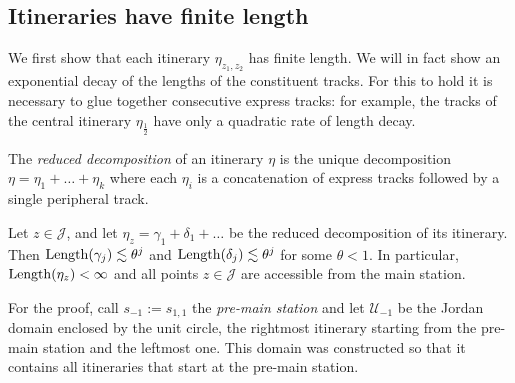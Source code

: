 \subsection{Itineraries have finite length}
We first show that each itinerary $\eta_{z_1,z_2}$ has finite length. We will in fact show an exponential decay of the lengths of the constituent tracks. For this to hold it is necessary to glue together consecutive express tracks: for example, the tracks of the central itinerary $\eta_{\frac 12}$ have only a quadratic rate of length decay.

\begin{definition}
	The \emph{reduced decomposition} of an itinerary $\eta$ is the unique decomposition $\eta=\eta_1+\dots+\eta_k$ where each $\eta_i$ is a concatenation of express tracks followed by a single peripheral track.
\end{definition}

\begin{comment}
The following definition is used in the proof of \cref{prop:finite-length}.
\begin{definition}
	The \emph{shadow} of a station $s$ is the set of all terminals $z\in \mathcal J$ that are the endpoints of itineraries starting at $s$.
\end{definition}

Using this definition, we claim:
\end{comment}

\begin{proposition} \label{prop:finite-length}
	Let $z \in \mathcal J$, and let $\eta_z= \gamma_1 + \delta_1 + \dots  $ be the reduced decomposition of its itinerary. Then $\operatorname{Length}(\gamma_j)\lesssim \theta^j$ and $\operatorname{Length}(\delta_j)\lesssim \theta^j$ for some $\theta < 1$. In particular, $\operatorname{Length}(\eta_z)<\infty$ and all points $z\mathcal \in \mathcal J$ are accessible from the main station.
\end{proposition}

For the proof, call $s_{-1}:=s_{1,1}$ the \emph{pre-main station} and let $\mathcal U_{-1}$ be the Jordan domain enclosed by the unit circle, the rightmost itinerary starting from the pre-main station and the leftmost one. This domain was constructed so that it contains all itineraries that start at the pre-main station. 
\begin{comment}
We call an itinerary \emph{non-positive} if it is not contained in the positive real axis.
\end{comment}

